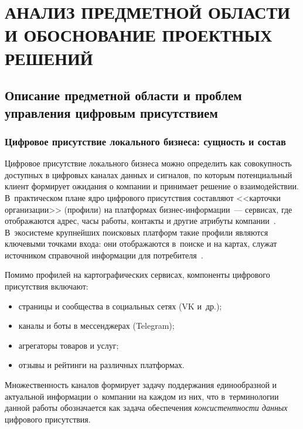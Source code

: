 
\chapter{{\fontsize{14pt}{21pt}\selectfont\MakeUppercase{Анализ предметной области и обоснование проектных решений}}}
\label{ch:chapter1}

\section{Описание предметной области и проблем управления цифровым присутствием}
\label{sec:ch1-subject}

\subsection{Цифровое присутствие локального бизнеса: сущность и состав}
\label{subsec:digital-presence}

Цифровое присутствие локального бизнеса можно определить как совокупность доступных в цифровых каналах данных и сигналов, по которым потенциальный клиент формирует ожидания о компании и принимает решение о взаимодействии.
В~практическом плане ядро цифрового присутствия составляют <<карточки организации>> (профили) на платформах бизнес-информации~--- сервисах, где отображаются адрес, часы работы, контакты и другие атрибуты компании~\cite{src:4, src:3}. В~экосистеме крупнейших поисковых платформ такие профили являются ключевыми точками входа: они отображаются в~поиске и на картах, служат источником справочной информации для потребителя~\cite{src:1, src:4}.

Помимо профилей на картографических сервисах, компоненты цифрового присутствия включают:

\begin{itemize}
  \item страницы и сообщества в социальных сетях (VK и~др.);
  \item каналы и боты в мессенджерах (Telegram);
  \item агрегаторы товаров и услуг;
  \item отзывы и рейтинги на различных платформах.
\end{itemize}

Множественность каналов формирует задачу поддержания единообразной и актуальной информации о~компании на каждом из них, что в~терминологии данной работы обозначается как задача обеспечения \textit{консистентности данных} цифрового присутствия.

